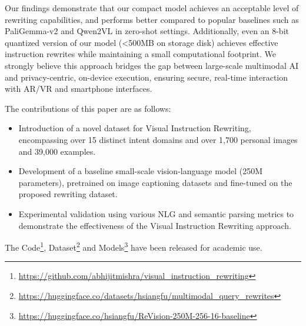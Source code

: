 Our findings demonstrate that our compact model achieves an acceptable level of rewriting capabilities, and performs better compared to popular baselines such as PaliGemma-v2 \cite{steiner2024paligemma} and Qwen2VL \cite{wang2024qwen2} in zero-shot settings. Additionally, even an 8-bit quantized version of our model (<500MB on storage disk) achieves effective instruction rewrites while maintaining a small computational footprint. We strongly believe this approach bridges the gap between large-scale multimodal AI and privacy-centric, on-device execution, ensuring secure, real-time interaction with AR/VR and smartphone interfaces.

The contributions of this paper are as follows:
\begin{itemize}
    \item Introduction of a novel dataset for Visual Instruction Rewriting, encompassing over 15 distinct intent domains and over 1,700 personal images and 39,000 examples.
    \item Development of a baseline small-scale vision-language model (250M parameters), pretrained on image captioning datasets and fine-tuned on the proposed rewriting dataset.
    \item Experimental validation using various NLG and semantic parsing metrics to demonstrate the effectiveness of the Visual Instruction Rewriting approach.
\end{itemize}

The Code\footnote{\url{https://github.com/abhijitmishra/visual_instruction_rewriting}}, Dataset\footnote{\url{https://huggingface.co/datasets/hsiangfu/multimodal_query_rewrites}} and Models\footnote{\url{https://huggingface.co/hsiangfu/ReVision-250M-256-16-baseline}} have been released for academic use. 


